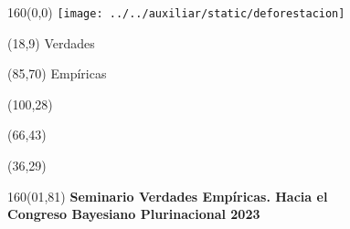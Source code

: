 \documentclass[shownotes,aspectratio=169]{beamer}
\begin{document}
\color{black!85}
\large


\begin{frame}


\begin{textblock}{160}(0,0)
\texttt{[image: ../../auxiliar/static/deforestacion]}
\end{textblock}

\begin{textblock}{80}(18,9)
\textcolor{black!15}{\fontsize{44}{55}\selectfont Verdades}
\end{textblock}

\begin{textblock}{47}(85,70)
\centering \textcolor{black!15}{{\fontsize{52}{65}\selectfont Empíricas}}
\end{textblock}

\begin{textblock}{80}(100,28)
\LARGE  \textcolor{black!15}{}
\end{textblock}

\begin{textblock}{80}(66,43)
\LARGE  \textcolor{black!15}{\scalebox{6}{$=$}}
\end{textblock}

\begin{textblock}{80}(36,29)
\LARGE  \textcolor{black!15}{\scalebox{9}{$p$}}
\end{textblock}



\begin{textblock}{160}(01,81)
\footnotesize \textcolor{black!5}{\textbf{Seminario Verdades Empíricas. Hacia el \\
Congreso Bayesiano Plurinacional 2023} \\}
\end{textblock}

\end{frame}
\end{document}
